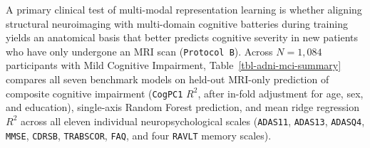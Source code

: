 \documentclass[
  10pt,
  letterpaper,
]{report}
\begin{document}
A primary clinical test of multi-modal representation learning is
whether aligning structural neuroimaging with multi-domain cognitive
batteries during training yields an anatomical basis that better
predicts cognitive severity in new patients who have only undergone an
MRI scan (\texttt{Protocol\ B}). Across \(N = 1,084\) participants with
Mild Cognitive Impairment, Table~\ref{tbl-adni-mci-summary} compares all
seven benchmark models on held-out MRI-only prediction of composite
cognitive impairment (\texttt{CogPC1} \(R^2\), after in-fold adjustment
for age, sex, and education), single-axis Random Forest prediction, and
mean ridge regression \(R^2\) across all eleven individual
neuropsychological scales (\texttt{ADAS11}, \texttt{ADAS13},
\texttt{ADASQ4}, \texttt{MMSE}, \texttt{CDRSB}, \texttt{TRABSCOR},
\texttt{FAQ}, and four \texttt{RAVLT} memory scales).
\end{document}
